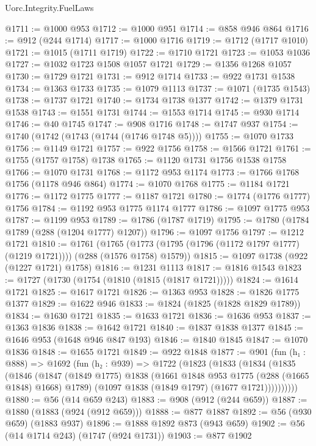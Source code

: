 \begin{lexlean}{Uorc.Integrity.FuelLaws}
\begin{coremodule}
@1711 := @1000 @953
@1712 := @1000 @951
@1714 := @858 @946 @864
@1716 := @912 (@244 @1714)
@1717 := @1000 @1716
@1719 := @1712 (@1717 @1010)
@1721 := @1015 (@1711 @1719)
@1722 := @1710 @1721
@1723 := @1053 @1036
@1727 := @1032 @1723 @1508 @1057 @1721
@1729 := @1356 @1268 @1057
@1730 := @1729 @1721
@1731 := @912 @1714
@1733 := @922 @1731 @1538
@1734 := @1363 @1733
@1735 := @1079 @1113
@1737 := @1071 (@1735 @1543)
@1738 := @1737 @1721
@1740 := @1734 @1738 @1377
@1742 := @1379 @1731 @1538
@1743 := @1551 @1731
@1744 := @1553 @1714
@1745 := @930 @1714
@1746 := @40 @1745
@1747 := @908 @1716
@1748 := @1747 @937
@1754 := @1740 (@1742 (@1743 (@1744 (@1746 @1748 @5))))
@1755 := @1070 @1733
@1756 := @1149 @1721
@1757 := @922 @1756
@1758 := @1566 @1721
@1761 := @1755 (@1757 @1758) @1738
@1765 := @1120 @1731 @1756 @1538 @1758
@1766 := @1070 @1731
@1768 := @1172 @953 @1174
@1773 := @1766 @1768 @1756 (@1178 @946 @864)
@1774 := @1070 @1768
@1775 := @1184 @1721
@1776 := @1172 @1775
@1777 := @1187 @1721
@1780 := @1774 (@1776 @1777) @1756
@1784 := @1192 @953 @1775 @1174 @1777
@1786 := @1097 @1775 @953
@1787 := @1199 @953
@1789 := @1786 (@1787 @1719)
@1795 := @1780 (@1784 @1789 (@288 (@1204 @1777) @1207))
@1796 := @1097 @1756
@1797 := @1212 @1721
@1810 := @1761
    (@1765 (@1773 (@1795 (@1796 (@1172 @1797 @1777) (@1219 @1721)))) (@288 (@1576 @1758) @1579))
@1815 := @1097 @1738 (@922 (@1227 @1721) @1758)
@1816 := @1231 @1113
@1817 := @1816 @1543
@1823 := @1727 (@1730 (@1754 (@1810 (@1815 (@1817 @1721)))))
@1824 := @1614 @1721
@1825 := @1617 @1721
@1826 := @1363 @953
@1828 := @1826 @1775 @1377
@1829 := @1622 @946
@1833 := @1824 (@1825 (@1828 @1829 @1789))
@1834 := @1630 @1721
@1835 := @1633 @1721
@1836 := @1636 @953
@1837 := @1363 @1836
@1838 := @1642 @1721
@1840 := @1837 @1838 @1377
@1845 := @1646 @953 (@1648 @946 @847 @193)
@1846 := @1840 @1845
@1847 := @1070 @1836
@1848 := @1655 @1721
@1849 := @922 @1848
@1877 := @901
    (fun (h₁ : @888) =>
    @1692
      (fun (h₂ : @939) =>
      @1722
        (@1823
          (@1833
            (@1834
              (@1835
                (@1846
                  (@1847
                    (@1849 @1775)
                    @1838
                    (@1661 @1848 @953 @1775 (@288 (@1665 @1848) @1668) @1789)
                    (@1097 @1838 (@1849 @1797) (@1677 @1721))))))))))
@1880 := @56 (@14 @659 @243)
@1883 := @908 (@912 (@244 @659))
@1887 := @1880 (@1883 (@924 (@912 @659)))
@1888 := @877 @1887
@1892 := @56 (@930 @659) (@1883 @937)
@1896 := @1888 @1892 @873 (@943 @659)
@1902 := @56 (@14 @1714 @243) (@1747 (@924 @1731))
@1903 := @877 @1902

\end{coremodule}
\end{lexlean}
